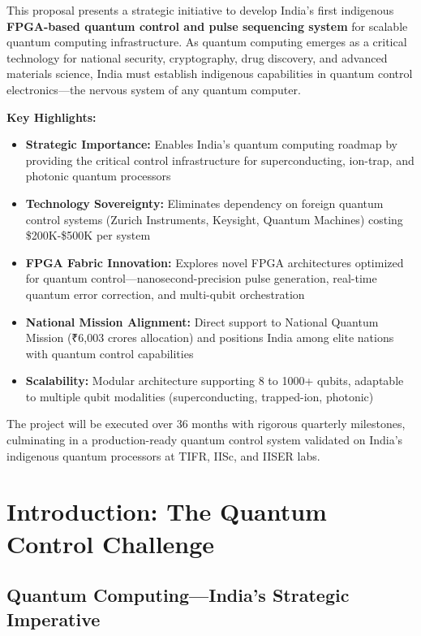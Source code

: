 \documentclass[12pt,a4paper]{article}
\begin{document}
This proposal presents a strategic initiative to develop India's first indigenous \textbf{FPGA-based quantum control and pulse sequencing system} for scalable quantum computing infrastructure. As quantum computing emerges as a critical technology for national security, cryptography, drug discovery, and advanced materials science, India must establish indigenous capabilities in quantum control electronics—the nervous system of any quantum computer.

\textbf{Key Highlights:}
\begin{itemize}[leftmargin=*]
    \item \textbf{Strategic Importance:} Enables India's quantum computing roadmap by providing the critical control infrastructure for superconducting, ion-trap, and photonic quantum processors
    \item \textbf{Technology Sovereignty:} Eliminates dependency on foreign quantum control systems (Zurich Instruments, Keysight, Quantum Machines) costing \$200K-\$500K per system
    \item \textbf{FPGA Fabric Innovation:} Explores novel FPGA architectures optimized for quantum control—nanosecond-precision pulse generation, real-time quantum error correction, and multi-qubit orchestration
    \item \textbf{National Mission Alignment:} Direct support to National Quantum Mission (₹6,003 crores allocation) and positions India among elite nations with quantum control capabilities
    \item \textbf{Scalability:} Modular architecture supporting 8 to 1000+ qubits, adaptable to multiple qubit modalities (superconducting, trapped-ion, photonic)
\end{itemize}

The project will be executed over 36 months with rigorous quarterly milestones, culminating in a production-ready quantum control system validated on India's indigenous quantum processors at TIFR, IISc, and IISER labs.

\newpage

\section{Introduction: The Quantum Control Challenge}

\subsection{Quantum Computing—India's Strategic Imperative}
\end{document}
